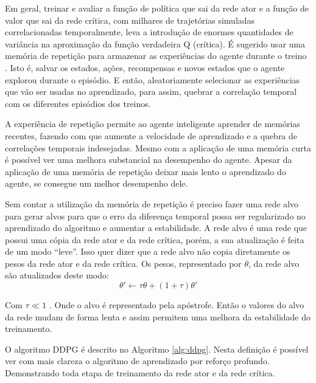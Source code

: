 Em geral, treinar e avaliar a função de política que sai da rede ator e a função de valor que sai da rede crítica, com milhares de trajetórias simuladas correlacionadas temporalmente, leva a introdução de enormes quantidades de variância na aproximação da função verdadeira Q (crítica).
É sugerido usar uma memória de repetição para armazenar as experiências do agente durante o treino \cite{schaul2015prioritized}. 
Isto é, salvar os estados, ações, recompensas e novos estados que o agente explorou durante o episódio.
E então, aleatoriamente selecionar as experiências que vão ser usadas no aprendizado, para assim, quebrar a correlação temporal com os diferentes episódios dos treinos.

A experiência de repetição permite ao agente inteligente aprender de memórias recentes, fazendo com que aumente a velocidade de aprendizado e a quebra de correlações temporais indesejadas. Mesmo com a aplicação de uma memória curta é possível ver uma melhora substancial na desempenho do agente. 
Apesar da aplicação de uma memória de repetição deixar mais lento o aprendizado do agente, se consegue um melhor desempenho dele.

Sem contar a utilização da memória de repetição é preciso fazer uma rede alvo para gerar alvos para que o erro da diferença temporal possa ser regularizado no aprendizado do algoritmo e aumentar a estabilidade. 
A rede alvo é uma rede que possui uma cópia da rede ator e da rede crítica, porém, a sua atualização é feita de um modo “leve”.
Isso quer dizer que a rede alvo não copia diretamente os pesos da rede ator e da rede crítica. 
Os pesos, representado por $\theta$, da rede alvo são atualizados deste modo:
\begin{equation}
    \theta' \leftarrow \tau \theta + (1+\tau)\theta'
\end{equation}

Com $\tau \ll 1$ . Onde o alvo é representado pela apóstrofe.
Então o valores do alvo da rede mudam de forma lenta e assim permitem uma melhora da estabilidade do treinamento.

O algoritmo DDPG é descrito no Algoritmo \ref{alg:ddpg}. Nesta definição é possível ver com mais clareza o algoritmo de aprendizado por reforço profundo. Demonstrando toda etapa de treinamento da rede ator e da rede crítica.

